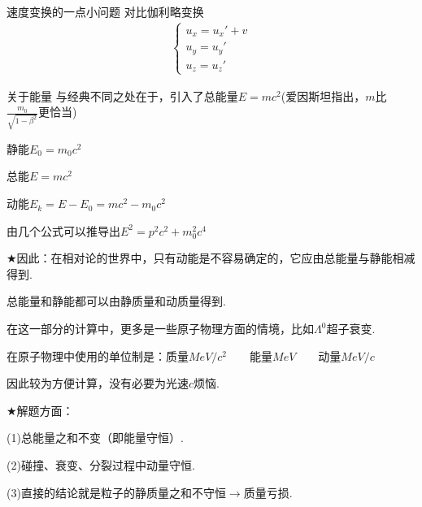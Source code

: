 \documentclass[a4paper,titlepage,onecolmn]{ctexart}
\begin{document}
\begin{section}{速度变换的一点小问题}
对比伽利略变换
\begin{align*}
\begin{cases}
u_x=u_x'+v\\
u_y=u_y'\\
u_z=u_z'
\end{cases}
\end{align*}
\end{section}

\begin{section}{关于能量}
与经典不同之处在于，引入了总能量$E=mc^2$(爱因斯坦指出，$m$比$\frac{m_0}{\sqrt{1-\beta^2}}$更恰当)

静能$E_0=m_0c^2$

总能$E=mc^2$

动能$E_k=E-E_0=mc^2-m_0c^2$

由几个公式可以推导出$E^2=p^2c^2+m_0^2c^4$

$\bigstar$因此：在相对论的世界中，只有动能是不容易确定的，它应由总能量与静能相减得到.

总能量和静能都可以由静质量和动质量得到.

在这一部分的计算中，更多是一些原子物理方面的情境，比如$\Lambda^0$超子衰变.

在原子物理中使用的单位制是：质量$MeV/c^2\hspace{2em}$能量$MeV\hspace{2em}$动量$MeV/c$

因此较为方便计算，没有必要为光速$c$烦恼.

$\bigstar$解题方面：

(1)总能量之和不变（即能量守恒）.

(2)碰撞、衰变、分裂过程中动量守恒.

(3)直接的结论就是粒子的静质量之和不守恒$\rightarrow$质量亏损.
\end{section}
\end{document}

